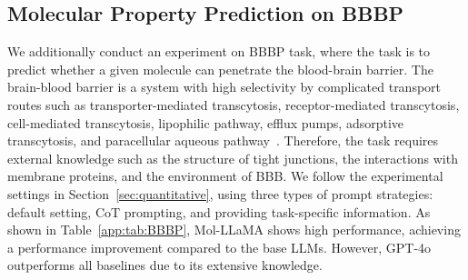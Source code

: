 



\subsection{Molecular Property Prediction on BBBP\label{app:sec:additional_bbbp}}
We additionally conduct an experiment on BBBP task, where the task is to predict whether a given molecule can penetrate the blood-brain barrier. The brain-blood barrier is a system with high selectivity by complicated transport routes such as transporter-mediated transcytosis, receptor-mediated transcytosis, cell-mediated transcytosis, lipophilic pathway, efflux pumps, adsorptive transcytosis, and paracellular aqueous pathway~\cite{wu2023bbbstructure}. Therefore, the task requires external knowledge such as the structure of tight junctions, the interactions with membrane proteins, and the environment of BBB. We follow the experimental settings in Section~\ref{sec:quantitative}, using three types of prompt strategies: default setting, CoT prompting, and providing task-specific information. As shown in Table~\ref{app:tab:BBBP}, Mol-LLaMA shows high performance, achieving a performance improvement compared to the base LLMs. However, GPT-4o outperforms all baselines due to its extensive knowledge.


\clearpage

\clearpage

\clearpage

